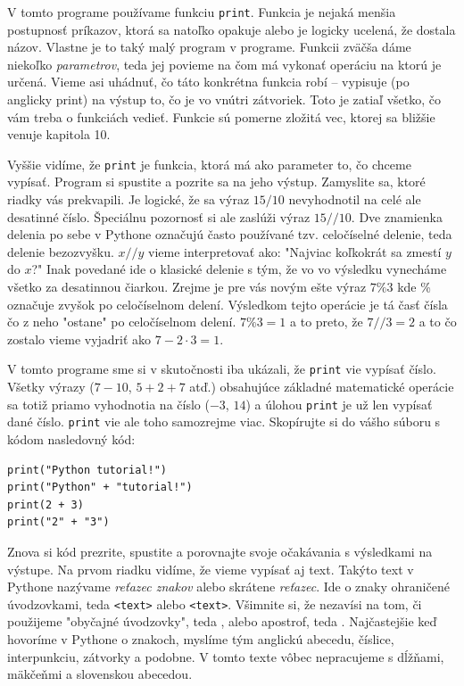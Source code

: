 V tomto programe používame funkciu \texttt{print}. Funkcia je nejaká menšia postupnosť príkazov, ktorá sa natoľko opakuje alebo je logicky ucelená, že dostala názov. Vlastne je to taký malý program v programe. Funkcii zväčša dáme niekoľko \textit{parametrov}, teda jej povieme na čom má vykonať operáciu na ktorú je určená. Vieme asi uhádnuť, čo táto konkrétna funkcia robí -- vypisuje (po anglicky print) na výstup to, čo je vo vnútri zátvoriek. Toto je zatiaľ všetko, čo vám treba o funkciách vedieť. Funkcie sú pomerne zložitá vec, ktorej sa bližšie venuje kapitola 10.

Vyššie vidíme, že \texttt{print} je funkcia, ktorá má ako parameter to, čo chceme vypísať. Program si spustite a pozrite sa na jeho výstup. Zamyslite sa, ktoré riadky vás prekvapili. Je logické, že sa výraz $15 / 10$ nevyhodnotil na celé ale desatinné číslo. Špeciálnu pozornosť si ale zaslúži výraz $15 // 10$. Dve znamienka delenia po sebe v Pythone označujú často používané tzv. celočíselné delenie, teda delenie bezozvyšku. $x // y$ vieme interpretovať ako: "Najviac koľkokrát sa zmestí $y$ do $x$?" Inak povedané ide o klasické delenie s tým, že vo vo výsledku vynecháme všetko za desatinnou čiarkou. Zrejme je pre vás novým ešte výraz $7 \% 3$ kde \% označuje zvyšok po celočíselnom delení. Výsledkom tejto operácie je tá časť čísla čo z neho "ostane" po celočíselnom delení. $7\%3=1$ a to preto, že $7//3=2$ a to čo zostalo vieme vyjadriť ako $7 - 2 \cdot 3 = 1$.

V tomto programe sme si v skutočnosti iba ukázali, že \texttt{print} vie vypísať číslo. Všetky výrazy ($7-10$, $5+2+7$ atď.) obsahujúce základné matematické operácie sa totiž priamo vyhodnotia na číslo ($-3$, $14$) a úlohou \texttt{print} je už len vypísať dané číslo. \texttt{print} vie ale toho samozrejme viac. Skopírujte si do vášho súboru s kódom nasledovný kód:

\begin{lstlisting}
print("Python tutorial!")
print("Python" + "tutorial!")
print(2 + 3)
print("2" + "3")
\end{lstlisting}

Znova si kód prezrite, spustite a porovnajte svoje očakávania s výsledkami na výstupe. Na prvom riadku vidíme, že vieme vypísať aj text. Takýto text v Pythone nazývame \textit{reťazec znakov} alebo skrátene \textit{reťazec}. Ide o znaky ohraničené úvodzovkami, teda \texttt{\textquotedbl<text>\textquotedbl} alebo \texttt{\textquotesingle<text>\textquotesingle}. Všimnite si, že nezavísi na tom, či použijeme "obyčajné úvodzovky", teda \texttt{\textquotedbl}, alebo apostrof, teda \textquotesingle. Najčastejšie keď hovoríme v Pythone o znakoch, myslíme tým anglickú abecedu, číslice, interpunkciu, zátvorky a podobne. V tomto texte vôbec nepracujeme s dĺžňami, mäkčeňmi a slovenskou abecedou.

